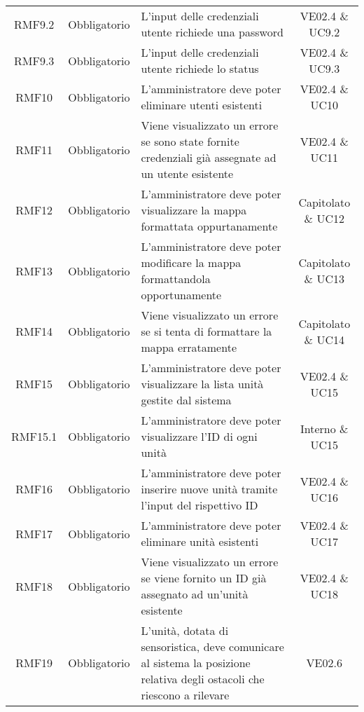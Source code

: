 \begin{longtable}[h!] { c c m{8cm} c}
		RMF9.2 & Obbligatorio & L'input delle credenziali utente richiede una password & VE02.4 \& UC9.2 \\

		RMF9.3 & Obbligatorio & L'input delle credenziali utente richiede lo status & VE02.4 \& UC9.3 \\
		
		RMF10 & Obbligatorio & L'amministratore deve poter eliminare utenti esistenti & VE02.4 \& UC10 \\

		RMF11 & Obbligatorio & Viene visualizzato un errore se sono state fornite credenziali già assegnate ad un utente esistente & VE02.4 \& UC11 \\

		RMF12 & Obbligatorio & L'amministratore deve poter visualizzare la mappa formattata oppurtanamente & Capitolato \& UC12 \\

		RMF13 & Obbligatorio & L'amministratore deve poter modificare la mappa formattandola opportunamente & Capitolato \& UC13 \\

		RMF14 & Obbligatorio & Viene visualizzato un errore se si tenta di formattare la mappa erratamente & Capitolato \& UC14 \\

		RMF15 & Obbligatorio & L'amministratore deve poter visualizzare la lista unità gestite dal sistema & VE02.4 \& UC15 \\

		RMF15.1 & Obbligatorio & L'amministratore deve poter visualizzare l'ID di ogni unità & Interno \& UC15 \\

		RMF16 & Obbligatorio & L'amministratore deve poter inserire nuove unità tramite l'input del rispettivo ID & VE02.4 \& UC16 \\

		RMF17& Obbligatorio & L'amministratore deve poter eliminare unità esistenti & VE02.4 \& UC17 \\

		RMF18 & Obbligatorio & Viene visualizzato un errore se viene fornito un ID già assegnato ad un'unità esistente & VE02.4 \& UC18 \\

		RMF19 & Obbligatorio & L'unità, dotata di sensoristica, deve comunicare al sistema la posizione relativa degli ostacoli che riescono a rilevare & VE02.6 \\


\end{longtable}
